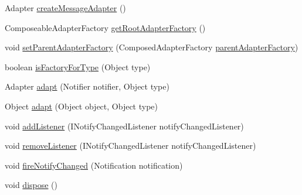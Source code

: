 \begin{DoxyCompactItemize}
\item 
Adapter \hyperlink{classshootingmachineemfmodel_1_1provider_1_1_shootingmachineemfmodel_item_provider_adapter_factory_aaab2f951fb31fcf8172744caab7c480e}{create\-Message\-Adapter} ()
\item 
Composeable\-Adapter\-Factory \hyperlink{classshootingmachineemfmodel_1_1provider_1_1_shootingmachineemfmodel_item_provider_adapter_factory_a7e0449c23e459ebbd6dd50da7d0c9085}{get\-Root\-Adapter\-Factory} ()
\item 
void \hyperlink{classshootingmachineemfmodel_1_1provider_1_1_shootingmachineemfmodel_item_provider_adapter_factory_a60be5764e7b820fae44a614f838d117b}{set\-Parent\-Adapter\-Factory} (Composed\-Adapter\-Factory \hyperlink{classshootingmachineemfmodel_1_1provider_1_1_shootingmachineemfmodel_item_provider_adapter_factory_aefa932b17c6961fbfbead5540d214176}{parent\-Adapter\-Factory})
\item 
boolean \hyperlink{classshootingmachineemfmodel_1_1provider_1_1_shootingmachineemfmodel_item_provider_adapter_factory_ac02041f3111130056d7d0dd20648bb12}{is\-Factory\-For\-Type} (Object type)
\item 
Adapter \hyperlink{classshootingmachineemfmodel_1_1provider_1_1_shootingmachineemfmodel_item_provider_adapter_factory_a2cb88ef6962b8366097d9fe691790dde}{adapt} (Notifier notifier, Object type)
\item 
Object \hyperlink{classshootingmachineemfmodel_1_1provider_1_1_shootingmachineemfmodel_item_provider_adapter_factory_a60ee81b80f4bc8d5083903e43f3b54d4}{adapt} (Object object, Object type)
\item 
void \hyperlink{classshootingmachineemfmodel_1_1provider_1_1_shootingmachineemfmodel_item_provider_adapter_factory_a19767a479130e0ba45c73b4868f96402}{add\-Listener} (I\-Notify\-Changed\-Listener notify\-Changed\-Listener)
\item 
void \hyperlink{classshootingmachineemfmodel_1_1provider_1_1_shootingmachineemfmodel_item_provider_adapter_factory_ab31c34e824c8486c3830d0ae32f6261b}{remove\-Listener} (I\-Notify\-Changed\-Listener notify\-Changed\-Listener)
\item 
void \hyperlink{classshootingmachineemfmodel_1_1provider_1_1_shootingmachineemfmodel_item_provider_adapter_factory_a804ba049fd79f648d54aad9033c9eecd}{fire\-Notify\-Changed} (Notification notification)
\item 
void \hyperlink{classshootingmachineemfmodel_1_1provider_1_1_shootingmachineemfmodel_item_provider_adapter_factory_a06b61872a84d6ead2957a8fb3ab61c01}{dispose} ()
\end{DoxyCompactItemize}
